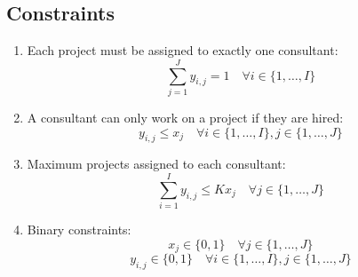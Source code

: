 \documentclass{article}
\begin{document}
\subsection*{Constraints}
\begin{enumerate}
    \item Each project must be assigned to exactly one consultant:
    \[
    \sum_{j=1}^{J} y_{i,j} = 1 \quad \forall i \in \{1, \ldots, I\}
    \]
    
    \item A consultant can only work on a project if they are hired:
    \[
    y_{i,j} \leq x_j \quad \forall i \in \{1, \ldots, I\}, j \in \{1, \ldots, J\}
    \]
    
    \item Maximum projects assigned to each consultant:
    \[
    \sum_{i=1}^{I} y_{i,j} \leq K x_j \quad \forall j \in \{1, \ldots, J\}
    \]
    
    \item Binary constraints:
    \[
    x_j \in \{0, 1\} \quad \forall j \in \{1, \ldots, J\}
    \]
    \[
    y_{i,j} \in \{0, 1\} \quad \forall i \in \{1, \ldots, I\}, j \in \{1, \ldots, J\}
    \]
\end{enumerate}
\end{document}
